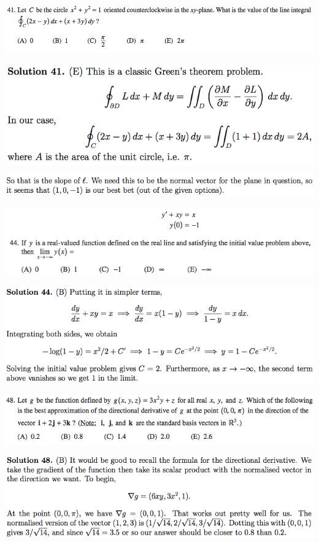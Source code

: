 \documentclass{article}
\begin{document}
\includegraphics[scale=0.5]{0568_41}

\includegraphics[scale=0.5]{0568_41s}

\includegraphics[scale=0.65]{1268_41s2}

\includegraphics[scale=0.65]{1268_44}

\includegraphics[scale=0.65]{1268_44s}


\includegraphics[scale=0.65]{1268_48}

\includegraphics[scale=0.65]{1268_48s}
\end{document}
